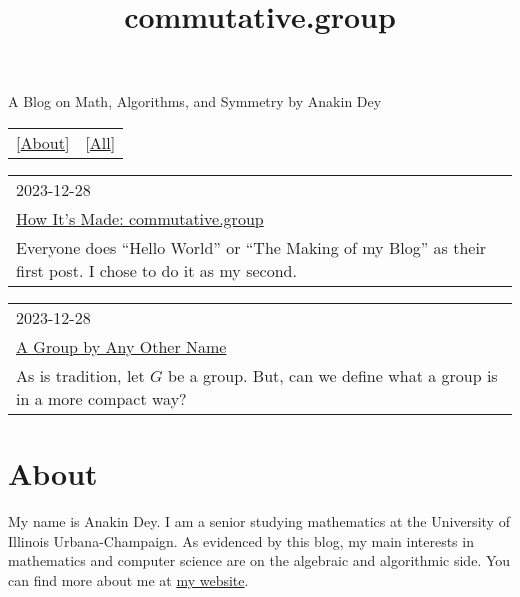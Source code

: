 \documentclass{article}
\title{commutative.group}
\begin{document}
\maketitle
\newline
\begin{center}
  A Blog on Math, Algorithms, and Symmetry by Anakin Dey
\end{center}
\begin{table}
  \centering
  \begin{tabular}{cc}
    \LARGE[\href{About.html}{About}] & \LARGE[\href{All-Posts.html}{All}]
  \end{tabular}
\end{table}

\begin{table}
  \centering
  \begin{tabular}{|l|}
    \hline
    \large 2023-12-28 \\
    \LARGE \href{posts/abel.html}{How It's Made: commutative.group} \\
    Everyone does ``Hello World'' or ``The Making of my Blog'' as their first post. I chose to do it as my second.
    \hline
  \end{tabular}
\end{table}

\begin{table}
  \centering
  \begin{tabular}{|l|}
    \hline
    \large 2023-12-28 \\
    \LARGE \href{posts/other_name.html}{A Group by Any Other Name} \\
    As is tradition, let $G$ be a group. But, can we define what a group is in a more compact way? \\
    \hline
  \end{tabular}
\end{table}

\part*{\centering About}

\newline

My name is Anakin Dey.
I am a senior studying mathematics at the University of Illinois Urbana-Champaign.
As evidenced by this blog, my main interests in mathematics and computer science are on the algebraic and algorithmic side.
You can find more about me at \href{https://www.anakin-dey.com/}{my website}.
\end{document}
